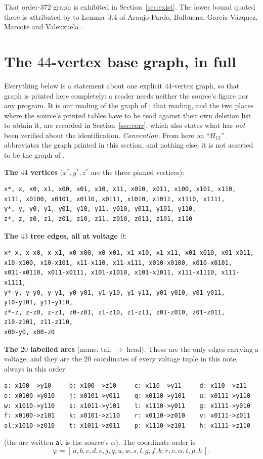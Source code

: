 \documentclass[11pt]{amsart}
\theoremstyle{remark}
\begin{document}
\noindent
That order-$372$ graph is exhibited in Section~\ref{sec:exist}. The lower bound quoted there is
attributed by \cite{AAB} to Lemma~3.4 of Araujo-Pardo, Balbuena, Garc\'ia-V\'azquez, Marcote
and Valenzuela \cite{ABGMV}.

\section{The $44$-vertex base graph, in full}\label{sec:base}

Everything below is a statement about one explicit $44$-vertex graph, so that graph is printed
here completely: a reader needs neither the source's figure nor any program. It is our reading
of the graph of \cite[Figure~16]{AAB}; that reading, and the two places where the source's
printed tables have to be read against their own deletion list to obtain it, are recorded in
Section~\ref{sec:corr}, which also states what has \emph{not} been verified about the
identification. \emph{Convention.} From here on ``$H_{12}$'' abbreviates the graph printed in
this section, and nothing else; it is not asserted to be the graph of \cite[Figure~16]{AAB}.

\medskip
\noindent\textbf{The $44$ vertices} ($x^{*},y^{*},z^{*}$ are the three pinned vertices):
{\small
\begin{verbatim}
x*, x, x0, x1, x00, x01, x10, x11, x010, x011, x100, x101, x110,
x111, x0100, x0101, x0110, x0111, x1010, x1011, x1110, x1111,
y*, y, y0, y1, y01, y10, y11, y010, y011, y101, y110,
z*, z, z0, z1, z01, z10, z11, z010, z011, z101, z110
\end{verbatim}}

\noindent\textbf{The $43$ tree edges, all at voltage $0$:}
{\footnotesize
\begin{verbatim}
x*-x, x-x0, x-x1, x0-x00, x0-x01, x1-x10, x1-x11, x01-x010, x01-x011,
x10-x100, x10-x101, x11-x110, x11-x111, x010-x0100, x010-x0101,
x011-x0110, x011-x0111, x101-x1010, x101-x1011, x111-x1110, x111-x1111,
y*-y, y-y0, y-y1, y0-y01, y1-y10, y1-y11, y01-y010, y01-y011,
y10-y101, y11-y110,
z*-z, z-z0, z-z1, z0-z01, z1-z10, z1-z11, z01-z010, z01-z011,
z10-z101, z11-z110,
x00-y0, x00-z0
\end{verbatim}}

\noindent\textbf{The $20$ labelled arcs} (name: tail $\to$ head). These are the only edges
carrying a voltage, and they are the $20$ coordinates of every voltage tuple in this note,
always in this order:
{\footnotesize
\begin{verbatim}
a: x100 ->y10     b: x100 ->z10     c: x110 ->y11     d: x110 ->z11
e: x0100->y010    j: x0101->y011    q: x0110->y101    u: x0111->y110
w: x1010->y110    s: x1011->y101    l: x1110->y011    g: x1111->y010
f: x0100->z101    k: x0101->z110    r: x0110->z010    v: x0111->z011
al:x1010->z010    t: x1011->z011    p: x1110->z101    h: x1111->z110
\end{verbatim}}
\noindent(the arc written \texttt{al} is the source's $\alpha$). The coordinate order is
\[
 \varphi=[\,a,b,c,d,e,j,q,u,w,s,l,g,f,k,r,v,\alpha,t,p,h\,].
\]
\end{document}
